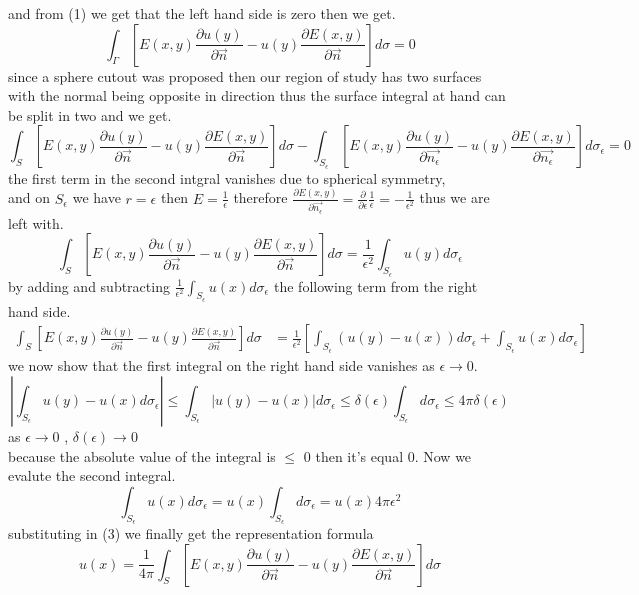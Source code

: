 \documentclass[]{article}
\begin{document}
and from (1) we get that the left hand side is zero then we get.
\[
    \int_\Gamma \left[E(x,y)\frac{\partial u(y)}{\partial \vec{n}}-u(y)\frac{\partial E(x,y)}{\partial \vec{n}}\right] d\sigma = 0    
\]
since a sphere cutout was proposed then our region of study has two surfaces with the normal being opposite in direction thus the surface integral at hand can be split in two and we get.
\[
    \int_S \left[E(x,y)\frac{\partial u(y)}{\partial \vec{n}}-u(y)\frac{\partial E(x,y)}{\partial \vec{n}}\right] d\sigma - \int_{S_\epsilon} \left[E(x,y)\frac{\partial u(y)}{\partial \vec{n_\epsilon}}-u(y)\frac{\partial E(x,y)}{\partial \vec{n_\epsilon}}\right] d\sigma_\epsilon  = 0    
\]
the first term in the second intgral vanishes due to spherical symmetry, 
\\and on $S_\epsilon$ we have $r=\epsilon$ then $E = \frac{1}{\epsilon}$ therefore $\displaystyle \frac{\partial E(x,y)}{\partial \vec{n_\epsilon}} = \frac{\partial}{\partial \epsilon}\frac{1}{\epsilon} = -\frac{1}{\epsilon^2}$
thus we are left with.
\[
    \int_S \left[E(x,y)\frac{\partial u(y)}{\partial \vec{n}}-u(y)\frac{\partial E(x,y)}{\partial \vec{n}}\right] d\sigma  = \frac{1}{\epsilon^2} \int_{S_\epsilon} u(y) d\sigma_\epsilon    
\]
by adding and subtracting $\displaystyle \frac{1}{\epsilon^2} \int_{S_\epsilon} u(x) d\sigma_\epsilon$ the following term from the right hand side.
\begin{align}
\int_S \left[E(x,y)\frac{\partial u(y)}{\partial \vec{n}}-u(y)\frac{\partial E(x,y)}{\partial \vec{n}}\right] d\sigma  &= \frac{1}{\epsilon^2} \left[\int_{S_\epsilon} (u(y) - u(x)) d\sigma_\epsilon + \int_{S_\epsilon} u(x) d\sigma_\epsilon\right]
\end{align}
we now show that the first integral on the right hand side vanishes as $\epsilon \to 0$.
\[
    \left|\int_{S_\epsilon} u(y)-u(x) d\sigma_\epsilon \right| \leq \int_{S_\epsilon} |u(y)-u(x)| d\sigma_\epsilon \leq \delta(\epsilon)\int_{S_\epsilon} d\sigma_\epsilon \leq 4\pi \delta(\epsilon)    
\]
as $\epsilon \to 0$ , $\delta(\epsilon) \to 0$
\\because the absolute value of the integral is $\leq$ 0 then it's equal 0. Now we evalute the second integral.
\[
    \int_{S_\epsilon} u(x)d\sigma_\epsilon = u(x)\int_{S_\epsilon}d\sigma_\epsilon = u(x) 4\pi\epsilon^2
\]
substituting in (3) we finally get the representation formula
\[
    u(x) = \frac{1}{4\pi} \int_S \left[E(x,y)\frac{\partial u(y)}{\partial \vec{n}}-u(y)\frac{\partial E(x,y)}{\partial \vec{n}}\right] d\sigma    
\]
\end{document}
